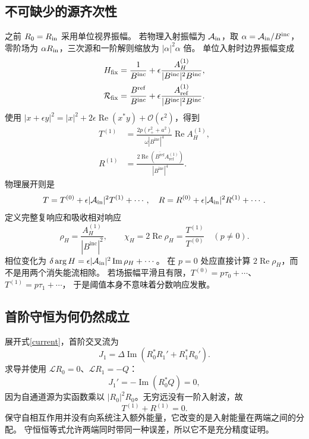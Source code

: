 \documentclass[UTF8,fontset=fandol,11pt,a4paper]{ctexart}
\newcommand{\Rea}{\operatorname{Re}}
\newcommand{\Ima}{\operatorname{Im}}
\newcommand{\Bin}{B^{\mathrm{inc}}}
\newcommand{\Bref}{B^{\mathrm{ref}}}
\newcommand{\AH}{A_H^{(1)}}
\newcommand{\Aref}{A_{\mathrm{ref}}^{(1)}}
\newcommand{\calO}{\mathcal O}
\numberwithin{equation}{section}
\begin{document}
\subsection{不可缺少的源齐次性}
之前 $R_0=R_{\rm in}$ 采用单位视界振幅。
若物理入射振幅为 $\mathcal A_{\rm in}$，取 $\alpha=\mathcal A_{\rm in}/\Bin$，
零阶场为 $\alpha R_{\rm in}$，三次源和一阶解则缩放为 $|\alpha|^2\alpha$ 倍。
单位入射时边界振幅变成
\begin{align}
H_{\rm fix}&=\frac1{\Bin}+\epsilon\frac{\AH}{|\Bin|^2\Bin},\\
\mathcal R_{\rm fix}&=\frac{\Bref}{\Bin}+\epsilon\frac{\Aref}{|\Bin|^2\Bin}.
\end{align}
使用 $|x+\epsilon y|^2=|x|^2+2\epsilon\Rea(x^*y)+\calO(\epsilon^2)$，得到
\begin{align}
T^{(1)}&=\frac{2p(r_+^2+a^2)}{\omega|\Bin|^4}\Rea\AH,\\
R^{(1)}&=\frac{2\Rea(\overline{\Bref}\Aref)}{|\Bin|^4}.
\end{align}
物理展开则是
\begin{equation}
T=T^{(0)}+\epsilon|\mathcal A_{\rm in}|^2T^{(1)}+\cdots,
\quad R=R^{(0)}+\epsilon|\mathcal A_{\rm in}|^2R^{(1)}+\cdots.
\end{equation}
定义完整复响应和吸收相对响应
\begin{equation}
\rho_H=\frac{\AH}{|\Bin|^2},\qquad
\chi_H=2\Rea\rho_H=\frac{T^{(1)}}{T^{(0)}}\quad(p\ne0).
\end{equation}
相位变化为 $\delta\arg H=\epsilon|\mathcal A_{\rm in}|^2\Ima\rho_H+\cdots$。
在 $p=0$ 处应直接计算 $2\Rea\rho_H$，而不是用两个消失能流相除。
若场振幅平滑且有限，$T^{(0)}=p\tau_0+\cdots$、$T^{(1)}=p\tau_1+\cdots$，
于是阈值本身不意味着分数响应发散。

\subsection{首阶守恒为何仍然成立}
展开式\eqref{current}，首阶交叉流为
\begin{equation}
J_1=\Delta\Ima(R_0^*R_1'+R_1^*R_0').
\end{equation}
求导并使用 $\mathcal LR_0=0$、$\mathcal LR_1=-Q$：
\begin{equation}J_1'=-\Ima(R_0^*Q)=0,\end{equation}
因为自通道源为实函数乘以 $|R_0|^2R_0$。无穷远没有一阶入射波，故
\begin{equation}\boxed{T^{(1)}+R^{(1)}=0.}\end{equation}
保守自相互作用并没有向系统注入额外能量，它改变的是入射能量在两端之间的分配。
守恒恒等式允许两端同时带同一种误差，所以它不是充分精度证明。
\end{document}
